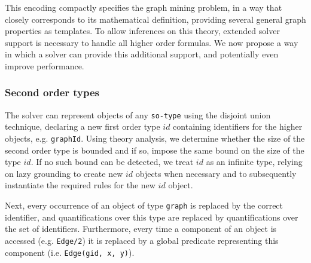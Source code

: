 This encoding compactly specifies the graph mining problem, in a way that closely corresponds to its mathematical definition, providing several general graph properties as templates.
To allow inferences on this theory, extended solver support is necessary to handle all higher order formulas.
We now propose a way in which a solver can provide this additional support, and potentially even improve performance.
\vspace{-1em}
\subsubsection{Second order types}
The solver can represent objects of any \lstinline|so-type| using the disjoint union technique, declaring a new first order type $id$ containing identifiers for the higher objects, e.g. \lstinline|graphId|.
Using theory analysis, we determine whether the size of the second order type is bounded and if so, impose the same bound on the size of the type $id$.
If no such bound can be detected, we treat $id$ as an infinite type, relying on lazy grounding to create new $id$ objects when necessary and to subsequently instantiate the required rules for the new $id$ object.

Next, every occurrence of an object of type \lstinline|graph| is replaced by the correct identifier, and quantifications over this type are replaced by quantifications over the set of identifiers. Furthermore, every time a component of an object is accessed (e.g. \lstinline|Edge/2|) it is replaced by a global predicate
representing this component (i.e. \lstinline|Edge(gid, x, y)|).
\vspace{-1em}
